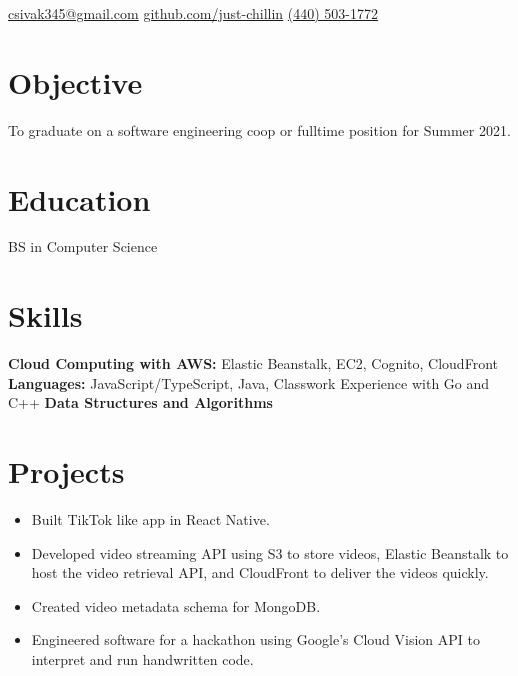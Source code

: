 \documentclass{cv}
\begin{document}
	
	\contact
		{\faEnvelopeSquare\space\href{mailto:csivak345@gmail.com}{csivak345@gmail.com}}
		{\faGithub\space\url{github.com/just-chillin}}
		{\faPhone\space\href{tel:14405031772}{(440) 503-1772}}
	\section{Objective}
	To graduate on a software engineering coop or fulltime position for Summer 2021.
	\section{Education}
	BS in Computer Science
	\section{Skills}
	\textbf{Cloud Computing with AWS:} Elastic Beanstalk, EC2, Cognito, CloudFront\newline
	\textbf{Languages:} JavaScript/TypeScript, Java, Classwork Experience with Go and C++\newline
	\textbf{Data Structures and Algorithms}
	
	\section{Projects}

	\begin{itemize}
		\vspace{-2mm}
		\item Built TikTok like app in React Native.
		\item Developed video streaming API using S3 to store videos, Elastic Beanstalk to host the video retrieval API, and CloudFront to deliver the videos quickly.
		\item Created video metadata schema for MongoDB.
	\end{itemize}
	
	\begin{itemize}
			\vspace{-2mm}
		 \item Engineered software for a hackathon using Google’s Cloud Vision API to interpret and run handwritten code.
	\end{itemize}
\end{document}
